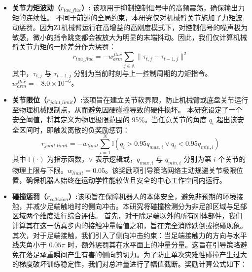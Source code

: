 \begin{itemize}
          \begin{equation}
              r_{joint\_acc} = - w^{acc}_{quad} \sum_{i \in \mathbb{Q}} \| \ddot{q}_{i} \|^2 - w^{acc}_{arm} \sum_{j \in \mathbb{A}} \| \ddot{q}_{j} \|^2
          \end{equation}
          其中，$\ddot{q}$ 为关节角加速度。对于四足机器人电机而言：$w^{acc}_{quad}=1.6\times10^{-8}$。对于机械臂电机而言：$w^{acc}_{arm}=6.0\times10^{-8}$，Z1机械臂对该项奖励系数不敏感。
    \item \textbf{关节力矩波动（$r_{tau\_fluc}$）:}
          该项用于抑制控制信号中的高频震荡，确保输出力矩的连续性。
          不同于前述的全局约束，本研究仅对机械臂关节施加了力矩波动惩罚。因为Z1机械臂运行在高增益的高刚度模式下，对控制信号的噪声极为敏感，微小的指令跳变都会被放大为明显的末端抖动。因此，我们仅计算机械臂关节力矩的一阶差分作为惩罚：
          \begin{equation}
              r_{tau\_fluc} = - w^{fluc}_{arm} \sum_{j \in \mathbb{A}} \| \tau_{t, j} - \tau_{t-1, j} \|^2
          \end{equation}
          其中，$\tau_{t, j}$ 与 $\tau_{t-1, j}$ 分别为当前时刻与上一控制周期的力矩指令。$w^{fluc}_{arm}=-8.0\times10^{-6}$。
    \item \textbf{关节限位（$r_{joint\_limit}$）:}该项旨在建立关节软界限，防止机械臂或底盘关节运行至物理机械限制点，从而避免因硬碰撞导致的硬件损坏。
          本研究设定了一个安全阈值，将其定义为物理极限范围的 95\%。当任意关节的角度 $q_i$ 超出该安全区间时，即触发离散的负奖励惩罚：
          \begin{equation}
              r_{joint\_limit} = - w_{limit} \sum_{i=1}^{N} \mathbb{I}\left( q_i > 0.95 q_{max, i} \lor q_i < 0.95 q_{min, i} \right)
          \end{equation}
          其中 $\mathbb{I}(\cdot)$ 为指示函数，$\lor$ 表示逻辑或，$q_{max, i}$ 与 $q_{min, i}$ 分别为第 $i$ 个关节的物理上限与下限。$w_{limit}=0.05$。该奖励项引导策略网络主动规避关节极限位置，确保机器人始终在运动学性能较优且安全的中心工作空间内运行。
    \item \textbf{碰撞惩罚（$r_{collision}$）:}该项旨在保障机器人的本体安全，避免非预期的环境接触，并减少足端触地时的侧向冲击。本研究将碰撞检测分为非足部区域与足部区域两个维度进行综合评估。
          首先，对于除足端以外的所有刚体部件，我们计算其在这一仿真步内的接触冲量幅值之和，旨在完全消除跌倒或擦碰现象。
          其次，对于足端接触，我们引入了侧向冲击约束：当足端接触力的方向与水平线夹角小于 $0.05\pi$ 时，额外惩罚其在水平面上的冲量分量。这旨在引导策略避免在落足承重瞬间产生有害的侧向剪切力。为了防止单次灾难性碰撞产生过大的梯度破坏训练稳定性，我们对总冲量进行了幅值截断。奖励计算公式如下：

\end{itemize}
